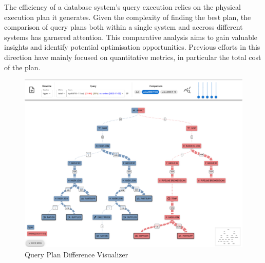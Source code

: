The efficiency of a database system's query execution relies on the physical execution plan it generates.  Given the complexity of finding the best plan, the comparison of query plans both within a single system and accross different systems has garnered attention. This comparative analysis aims to gain valuable insights and identify potential optimisation opportunities. Previous efforts in this direction have mainly focused on quantitative metrics, in particular the total cost of the plan.
\begin{figure}[h]
    \centering
    \includegraphics[width=0.8\linewidth]{figures/semantic-diff.png}
    \caption{Query Plan Difference Visualizer}
    \label{fig:semantic-diff}
  \end{figure}

